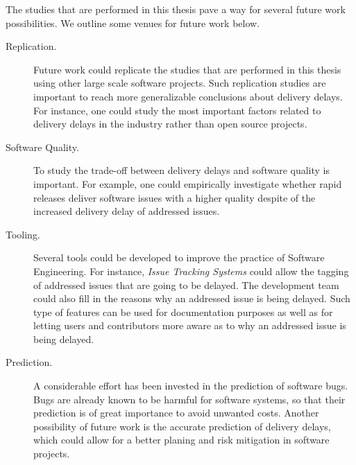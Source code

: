 The studies that are performed in this thesis pave a way for several future
work possibilities. We outline some venues for future work below. 

\begin{description}
		
	\item[Replication.] Future work could replicate the studies that are
		performed in this thesis using other large scale software
		projects. Such replication studies are important to reach more
		generalizable conclusions about delivery delays. For instance,
		one could study the most important factors related to delivery
		delays in the industry rather than open source projects.

	\item[Software Quality.] To study the trade-off between delivery delays
		and software quality is important. For example, one could
		empirically investigate whether rapid releases deliver software
		issues with a higher quality despite of the increased delivery
		delay of addressed issues.

	\item[Tooling.] Several tools could be developed to improve the practice
		of Software Engineering. For instance, {\em Issue Tracking
		Systems} could allow the tagging of addressed issues that are
		going to be delayed. The development team could also fill in the
		reasons why an addressed issue is being delayed. Such type of
		features can be used for documentation purposes as well as for
		letting users and contributors more aware as to why an addressed
		issue is being delayed.

	\item[Prediction.] A considerable effort has been invested in the
		prediction of software bugs. Bugs are already known to be
		harmful for software systems, so that their prediction is of
		great importance to avoid unwanted costs. Another possibility of
		future work is the accurate prediction of delivery delays, which
		could allow for a better planing and risk mitigation in software
		projects.

\end{description}

